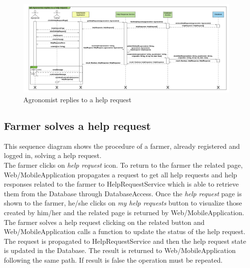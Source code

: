 \newpage
\begin{landscape}
\begin{figure}[t!]
\vspace*{1cm}
\noindent
\centering
\centerline{\includegraphics[scale= 0.108]{./Images/Sequence diagram/Agronomist replies to a help request.png}}
    \caption{Agronomist replies to a help request}
    \vspace*{-12cm}
\end{figure}
\fillandplacepagenumber
\end{landscape}

\subsection{Farmer solves a help request}

This sequence diagram shows the procedure of a farmer, already registered and logged in, solving a help request.\\
The farmer clicks on \textit{help request} icon. To return to the farmer the related page, Web/MobileApplication propagates a request to get all help requests and help responses related to the farmer to HelpRequestService which is able to retrieve them from the Database through DatabaseAccess. 
Once the \textit{help request} page is shown to the farmer, he/she clicks on \textit{my help requests} button to visualize those created by him/her and the related page is returned by Web/MobileApplication. The farmer solves a help request clicking on the related button and Web/MobileApplication calls a function to update the status of the help request. The request is propagated to HelpRequestService and then the help request state is updated in the Database. The result is returned to Web/MobileApplication following the same path. If result is false the operation must be repeated.

